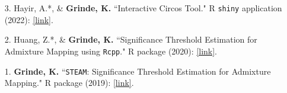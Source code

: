 \documentclass[margin]{res}
\newcommand{\annotateItem}[1]{
	\begin{itemize} \vspace{-0.1cm}
	\item[] 
	\begin{footnotesize}\textcolor{black}{(#1)}\end{footnotesize}
	\end{itemize} \vspace{-0.1cm}
}
\begin{document}
\begin{resume}
\begin{itemize}
\item[3.] Hayir, A.*, \& \textbf{Grinde, K.} ``Interactive Circos Tool." 
R \texttt{shiny} application (2022): \href{https://kblcircosgraph.shinyapps.io/circos/}{[link]}.
	
\item[2.] Huang, Z.*, \& \textbf{Grinde, K.} 
``Significance Threshold Estimation for Admixture Mapping using \texttt{Rcpp}." 
R package (2020): \href{https://github.com/GrindeLab/STEAMcpp}{[link]}.

\item[1.] \textbf{Grinde, K.} ``\texttt{STEAM}: Significance Threshold Estimation for Admixture Mapping." 
R package (2019): \href{https://github.com/kegrinde/STEAM}{[link]}.\\
	

\end{itemize}
\end{resume}
\end{document}
